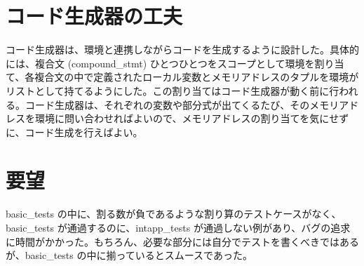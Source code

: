 \documentclass{jsarticle}
\begin{document}
\section{コード生成器の工夫}

コード生成器は、環境と連携しながらコードを生成するように設計した。具体的には、複合文 (compound\_stmt) ひとつひとつをスコープとして環境を割り当て、各複合文の中で定義されたローカル変数とメモリアドレスのタプルを環境がリストとして持てるようにした。この割り当てはコード生成器が動く前に行われる。コード生成器は、それぞれの変数や部分式が出てくるたび、そのメモリアドレスを環境に問い合わせればよいので、メモリアドレスの割り当てを気にせずに、コード生成を行えばよい。

\section{要望}

basic\_tests の中に、割る数が負であるような割り算のテストケースがなく、 basic\_tests が通過するのに、intapp\_tests が通過しない例があり、バグの追求に時間がかかった。もちろん、必要な部分には自分でテストを書くべきではあるが、basic\_tests の中に揃っているとスムースであった。
\end{document}
